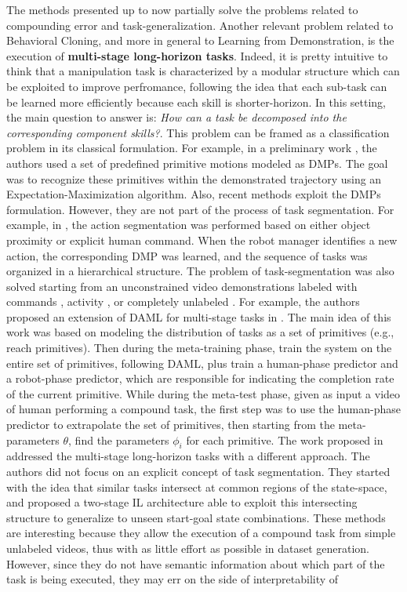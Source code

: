 % 

The methods presented up to now partially solve the problems related to compounding error and task-generalization. Another relevant problem related to Behavioral Cloning, and more in general to Learning from Demonstration, is the execution of \textbf{multi-stage long-horizon tasks}. Indeed, it is pretty intuitive to think that a manipulation task is characterized by a modular structure which can be exploited to improve perfromance, following the idea that each sub-task can be learned more efficiently because each skill is shorter-horizon. In this setting, the main question to answer is: \textit{How can a task be decomposed into the corresponding component skills?}. This problem can be framed as a classification problem in its classical formulation. For example, in a preliminary work \cite{meier2011movement_primitive}, the authors used a set of predefined primitive motions modeled as DMPs. The goal was to recognize these primitives within the demonstrated trajectory using an Expectation-Maximization algorithm. Also, recent methods \cite{caccavale2019kinesthetic,agostini2020manipulation} exploit the DMPs formulation. However, they are not part of the process of task segmentation. For example, in \cite{caccavale2019kinesthetic}, the action segmentation was performed based on either object proximity or explicit human command. When the robot manager identifies a new action, the corresponding DMP was learned, and the sequence of tasks was organized in a hierarchical structure. The problem of task-segmentation was also solved starting from an unconstrained video demonstrations labeled with commands \cite{xu2018neural_task_programming}, activity \cite{yang2015robot}, or completely unlabeled \cite{yu2018one_shot_hil,Mandlekar2020GTI}. For example, the authors proposed an extension of DAML for multi-stage tasks in \cite{yu2018one_shot_hil}. The main idea of this work was based on modeling the distribution of tasks as a set of primitives (e.g., reach primitives). Then during the meta-training phase, train the system on the entire set of primitives, following DAML, plus train a human-phase predictor and a robot-phase predictor, which are responsible for indicating the completion rate of the current primitive. While during the meta-test phase, given as input a video of human performing a compound task, the first step was to use the human-phase predictor to extrapolate the set of primitives, then starting from the meta-parameters $\theta$, find the parameters $\phi_{i}$ for each primitive. The work proposed in \cite{Mandlekar2020GTI} addressed the multi-stage long-horizon tasks with a different approach. The authors did not focus on an explicit concept of task segmentation. They started with the idea that similar tasks intersect at common regions of the state-space, and proposed a two-stage IL architecture able to exploit this intersecting structure to generalize to unseen start-goal state combinations. These methods are interesting because they allow the execution of a compound task from simple unlabeled videos, thus with as little effort as possible in dataset generation. However, since they do not have semantic information about which part of the task is being executed, they may err on the side of interpretability of 